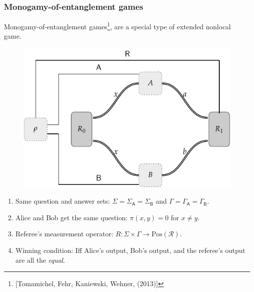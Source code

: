 \documentclass{beamer}
\def\R{\mathcal{R}}
\def \GammaA{\Gamma_{\reg{A}}}
\def \GammaB{\Gamma_{\reg{B}}}
\def \SigmaA{\Sigma_{\reg{A}}}
\def \SigmaB{\Sigma_{\reg{B}}}
\newcommand{\setft}[1]{\mathrm{#1}}
\newcommand{\Pos}{\setft{Pos}}
\newcommand{\reg}[1]{\mathsf{#1}}
\begin{document}
\begin{frame}
	\frametitle{Monogamy-of-entanglement games}
	Monogamy-of-entanglement games\footnote{[Tomamichel, Fehr, Kaniewski, Wehner, (2013)]}, are a special type of extended nonlocal game. 
\begin{figure}[!htpb] \label{fig:monogamy-of-entanglement game}
	\begin{center}
		\includegraphics[scale=0.6]{figures/moe_2.pdf}
	\end{center}
\end{figure}
	\begin{enumerate}
		\item Same question and answer sets: $\Sigma = \SigmaA = \SigmaB$ and $\Gamma = \GammaA = \GammaB$. 
		\item Alice and Bob get the same question: $\pi(x,y) = 0$ for $x \not= y$. 
		\item Referee's measurement operator: $R : \Sigma \times \Gamma \rightarrow \Pos(\R)$. 
		\item Winning condition: Iff Alice's output, Bob's output, and the referee's output are all the \emph{equal}. 
	\end{enumerate}
\end{frame}
\end{document}

